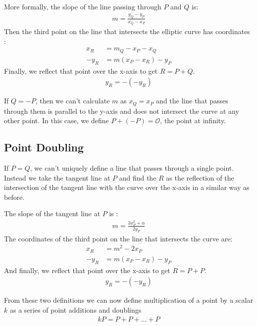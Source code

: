 \noindent
More formally, the slope of the line passing through $P$ and $Q$ is:
\begin{gather}
    m = \frac{y_Q - y_P}{x_Q - x_P}
\end{gather} 
Then the third point on the line that intersects the elliptic curve has coordinates \cite{enigbe_elliptic_curve_dlp}:
\begin{align}
    x_R &= m_Q - x_P - x_Q \\
    -y_R &= m(x_P - x_R) - y_P
\end{align}
Finally, we reflect that point over the x-axis to get $R = P + Q$.
\begin{gather}
    y_R = -(-y_R)
\end{gather}

If $Q = -P$, then we can't calculate $m$ as $x_Q = x_P$ and the line that passes through them is parallel to the y-axis and does not intersect the curve at any other point. In this case, we define $P + (-P) = \mathcal{O}$, the point at infinity.


\subsection{Point Doubling}

If $P = Q$, we can't uniquely define a line that passes through a single point. Instead we take the tangent line at $P$ and find the $R$ as the reflection of the intersection of the tangent line with the curve over the x-axis in a similar way as before.


\noindent
The slope of the tangent line at $P$ is \cite{enigbe_elliptic_curve_dlp}:
\begin{gather}
    m = \frac{3x_P^2 + \alpha}{2y_P}
\end{gather}
The coordinates of the third point on the line that intersects the curve are:
\begin{align}
    x_R &= m^2 - 2x_P \\
    -y_R &= m(x_P - x_R) - y_P
\end{align}
And finally, we reflect that point over the x-axis to get $R = P + P$.
\begin{gather}
    y_R = -(-y_R)
\end{gather}

From these two definitions we can now define multiplication of a point by a scalar $k$ as a series of point additions and doublings
\begin{gather}
    kP = P + P + \ldots + P
\end{gather}


